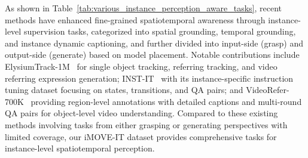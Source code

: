 As shown in Table~\ref{tab:various_instance_perception_aware_tasks}, recent methods have enhanced fine-grained spatiotemporal awareness through instance-level supervision tasks, categorized into spatial grounding, temporal grounding, and instance dynamic captioning, and further divided into input-side (grasp) and output-side (generate) based on model placement. Notable contributions include ElysiumTrack-1M~\citep{wang2024elysium} for single object tracking, referring tracking, and video referring expression generation; INST-IT~\citep{peng2024instit} with its instance-specific instruction tuning dataset focusing on states, transitions, and QA pairs; and VideoRefer-700K~\citep{yuan2024videorefer} providing region-level annotations with detailed captions and multi-round QA pairs for object-level video understanding. Compared to these existing methods involving tasks from either grasping or generating perspectives with limited coverage, 
our iMOVE-IT dataset provides comprehensive tasks for instance-level spatiotemporal perception.